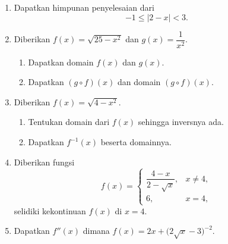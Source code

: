 \documentclass[11pt,openany,a4paper]{article}
\begin{document}
\begin{enumerate}
    \item Dapatkan himpunan penyelesaian dari
          \[
              -1 \leq |2 - x| < 3.
          \]

    \item Diberikan $f(x) = \sqrt{25 - x^2}$ dan $g(x) = \dfrac{1}{x^2}$.
          \begin{enumerate}
              \item Dapatkan domain $f(x)$ dan $g(x)$.
              \item Dapatkan $(g \circ f)(x)$ dan domain $(g \circ f)(x)$.
          \end{enumerate}

    \item Diberikan $f(x) = \sqrt{4 - x^2}$.
          \begin{enumerate}
              \item Tentukan domain dari $f(x)$ sehingga inversnya ada.
              \item Dapatkan $f^{-1}(x)$ beserta domainnya.
          \end{enumerate}

    \item Diberikan fungsi
          \[
              f(x) =
              \begin{cases}
                  \dfrac{4 - x}{2 - \sqrt{x}}, & x \neq 4, \\[1em]
                  6,                           & x = 4,
              \end{cases}
          \]
          selidiki kekontinuan $f(x)$ di $x = 4$.

    \item Dapatkan $f''(x)$ dimana
          $
              f(x) = 2x + \bigl( 2\sqrt{x} - 3 \bigr)^{-2}.
          $

\end{enumerate}

\end{document}
